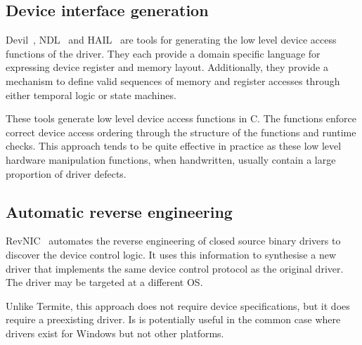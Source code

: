 \subsection{Device interface generation}

Devil~\cite{Merillon_RCMM_00}, NDL~\cite{Conway_Edwards_04} and HAIL~\cite{Sun_YKI_05} are tools for generating the low level device access functions of the driver. They each provide a domain specific language for expressing device register and memory layout. Additionally, they provide a mechanism to define valid sequences of memory and register accesses through either temporal logic or state machines. 

These tools generate low level device access functions in C. The functions enforce correct device access ordering through the structure of the functions and runtime checks. This approach tends to be quite effective in practice as these low level hardware manipulation functions, when handwritten, usually contain a large proportion of driver defects.

\subsection{Automatic reverse engineering}

RevNIC~\cite{revnic} automates the reverse engineering of closed source binary drivers to discover the device control logic. It uses this information to synthesise a new driver that implements the same device control protocol as the original driver. The driver may be targeted at a different OS. 

Unlike Termite, this approach does not require device specifications, but it does require a preexisting driver. Is is potentially useful in the common case where drivers exist for Windows but not other platforms.
